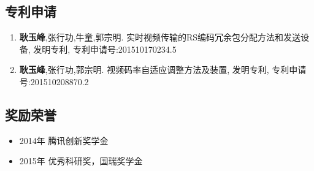 \subsection*{专利申请}
\newitemsep
{\typebib
\begin{enumerate}
    \item \textbf{耿玉峰},张行功,牛童,郭宗明. 实时视频传输的RS编码冗余包分配方法和发送设备, 发明专利, 专利申请号:201510170234.5
    \item \textbf{耿玉峰},张行功,郭宗明. 视频码率自适应调整方法及装置, 发明专利, 专利申请号:201510208870.2
\end{enumerate}
}

\subsection*{奖励荣誉}
\newitemsep
{\typebib
\begin{itemize}
    \item 2014年 \quad 腾讯创新奖学金
    \item 2015年 \quad 优秀科研奖，国瑞奖学金
\end{itemize}
}
